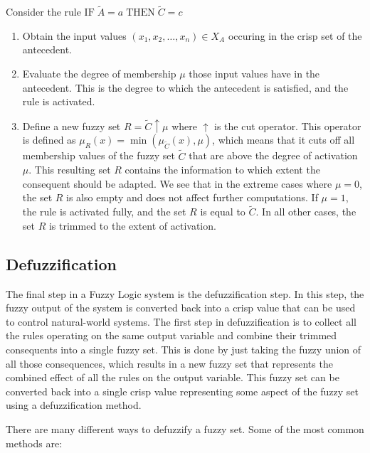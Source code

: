 \vspace{1em}

Consider the rule $\text{IF} \; \tilde{A} = a \; \text{THEN} \; \tilde{C} = c$

\begin{enumerate}
      \item Obtain the input values $(x_1, x_2, \ldots, x_n) \in X_{A}$ occuring in the crisp set of the antecedent.
      \item Evaluate the degree of membership $\mu$ those input values have in the antecedent. This is the degree to which the antecedent is satisfied, and the rule is activated.
      \item Define a new fuzzy set $R=\tilde{C}\uparrow \mu$ where $\uparrow$ is the cut operator.
            This operator is defined as $\mu_{R}(x) = \min(\mu_{\tilde{C}}(x), \mu)$, which means that it cuts off all membership values of the fuzzy set $\tilde{C}$ that are above the degree of activation $\mu$. This resulting set $R$ contains the information to which extent the consequent should be adapted. We see that in the extreme cases where $\mu = 0$, the set $R$ is also empty and does not affect further computations. If $\mu = 1$, the rule is activated fully, and the set $R$ is equal to $\tilde{C}$. In all other cases, the set $R$ is trimmed to the extent of activation.
\end{enumerate}

\subsection{Defuzzification}

The final step in a Fuzzy Logic system is the defuzzification step. In this step, the fuzzy output of the system is converted back into a crisp value that can be used to control natural-world systems. The first step in defuzzification is to collect all the rules operating on the same output variable and combine their trimmed consequents into a single fuzzy set. This is done by just taking the fuzzy union of all those consequences, which results in a new fuzzy set that represents the combined effect of all the rules on the output variable. This fuzzy set can be converted back into a single crisp value representing some aspect of the fuzzy set using a defuzzification method.

There are many different ways to defuzzify a fuzzy set. Some of the most common methods are:

